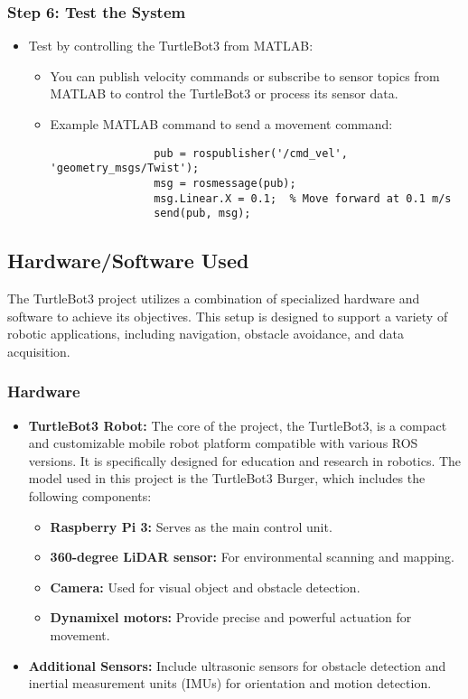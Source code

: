 \documentclass{article}
\begin{document}
	\subsubsection*{Step 6: Test the System}
	\begin{itemize}
		\item Test by controlling the TurtleBot3 from MATLAB:
		\begin{itemize}
			\item You can publish velocity commands or subscribe to sensor topics from MATLAB to control the TurtleBot3 or process its sensor data.
			\item Example MATLAB command to send a movement command:
			\begin{verbatim}
				pub = rospublisher('/cmd_vel', 'geometry_msgs/Twist');
				msg = rosmessage(pub);
				msg.Linear.X = 0.1;  % Move forward at 0.1 m/s
				send(pub, msg);
			\end{verbatim}
		\end{itemize}
	\end{itemize}
	\subsection{Hardware/Software Used}
	The TurtleBot3 project utilizes a combination of specialized hardware and software to achieve its objectives. This setup is designed to support a variety of robotic applications, including navigation, obstacle avoidance, and data acquisition.
	
	\subsubsection*{Hardware}
	\begin{itemize}
		\item \textbf{TurtleBot3 Robot:} The core of the project, the TurtleBot3, is a compact and customizable mobile robot platform compatible with various ROS versions. It is specifically designed for education and research in robotics. The model used in this project is the TurtleBot3 Burger, which includes the following components:
		\begin{itemize}
			\item \textbf{Raspberry Pi 3:} Serves as the main control unit.
			\item \textbf{360-degree LiDAR sensor:} For environmental scanning and mapping.
			\item \textbf{Camera:} Used for visual object and obstacle detection.
			\item \textbf{Dynamixel motors:} Provide precise and powerful actuation for movement.
		\end{itemize}
		\item \textbf{Additional Sensors:} Include ultrasonic sensors for obstacle detection and inertial measurement units (IMUs) for orientation and motion detection.
	\end{itemize}
	
\end{document}

